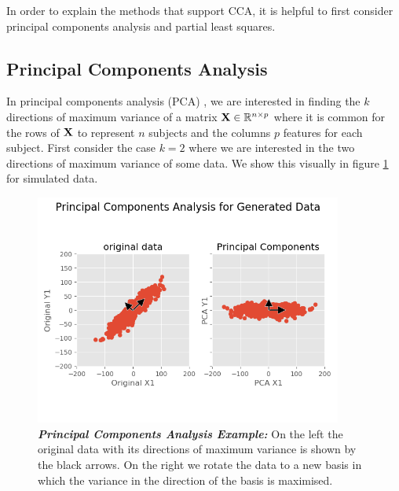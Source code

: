 In order to explain the methods that support CCA, it is helpful to first consider principal components analysis and partial least squares.

\subsection{Principal Components Analysis}\label{pca}

In principal components analysis (PCA) \cite{hotelling1933analysis}, we are interested in finding the $k$ directions of maximum variance of a matrix $\bold{X} \in \mathbb{R}^{n \times p}$  where it is common for the rows of $\bold{X}$ to represent $n$ subjects and the columns $p$ features for each subject. First consider the case $k=2$ where we are interested in the two directions of maximum variance of some data. We show this visually in figure \ref{fig:PCA} for simulated data.

\begin{figure}[H] %
    \centering %
    \includegraphics[width=0.9\textwidth]{chapters/background/PCA.png}
    \caption[Principal Components Analysis Example]{\textit{\textbf{Principal Components Analysis Example:}} On the left the original data with its directions of maximum variance is shown by the black arrows. On the right we rotate the data to a new basis in which the variance in the direction of the basis is maximised.}
    \label{fig:PCA}
\end{figure}

